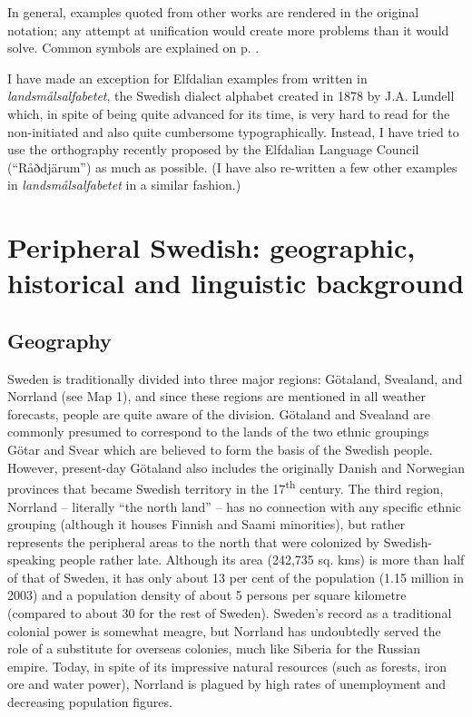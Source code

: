 \begin{styleBodyTextFirst}
In general, examples quoted from other works are rendered in the original notation; any attempt at unification would create more problems than it would solve. Common symbols are explained on p. \pageref{bkm:Ref224104485}.

\end{styleBodyTextFirst}

\begin{styleBodytextC}
I have made an exception for Elfdalian examples from \citet{Levander1909} written in \textit{landsmålsalfabetet}, the Swedish dialect alphabet created in 1878 by J.A. Lundell which, in spite of being quite advanced for its time, is very hard to read for the non-initiated and also quite cumbersome typographically. Instead, I have tried to use the orthography recently proposed by the Elfdalian Language Council (“Råðdjärum”) as much as possible. (I have also re-written a few other examples in \textit{landsmålsalfabetet }in a similar fashion.)

\end{styleBodytextC}

\chapter[Peripheral Swedish: geographic, historical and linguistic background]{Peripheral Swedish: geographic, historical and linguistic background}
\section{Geography}

\begin{styleBodyTextFirst}
Sweden is traditionally divided into three major regions: Götaland, Svealand, and Norrland (see Map 1), and since these regions are mentioned in all weather forecasts, people are quite aware of the division. Götaland and Svealand are commonly presumed to correspond to the lands of the two ethnic groupings Götar and Svear which are believed to form the basis of the Swedish people.  However, present-day Götaland also includes the originally Danish and Norwegian provinces that became Swedish territory in the 17\textsuperscript{th} century. The third region, Norrland – literally “the north land” – has no connection with any specific ethnic grouping (although it houses Finnish and Saami minorities), but rather represents the peripheral areas to the north that were colonized by Swedish-speaking people rather late. Although its area (242,735 sq. kms) is more than half of that of Sweden, it has only about 13 per cent of the population (1.15 million in 2003) and a population density of about 5 persons per square kilometre (compared to about 30 for the rest of Sweden). Sweden’s record as a traditional colonial power is somewhat meagre, but Norrland has undoubtedly served the role of a substitute for overseas colonies, much like Siberia for the Russian empire. Today, in spite of its impressive natural resources (such as forests, iron ore and water power), Norrland is plagued by high rates of unemployment and decreasing population figures. 

\end{styleBodyTextFirst}

